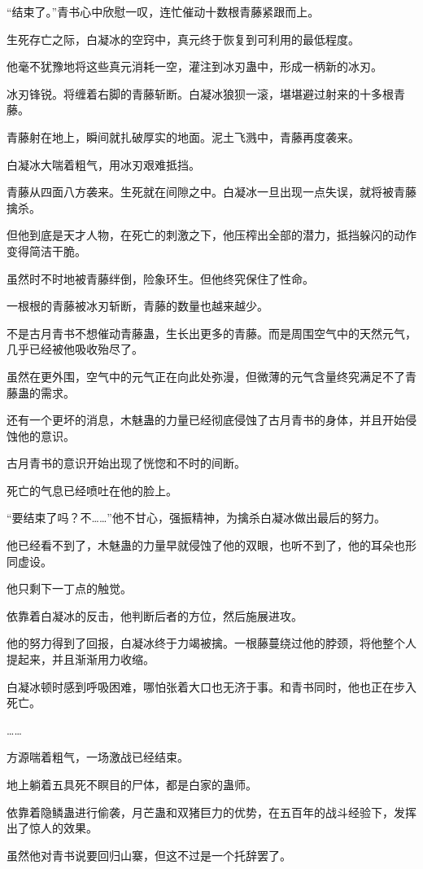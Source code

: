 \begin{this_body}
“结束了。”青书心中欣慰一叹，连忙催动十数根青藤紧跟而上。

生死存亡之际，白凝冰的空窍中，真元终于恢复到可利用的最低程度。

他毫不犹豫地将这些真元消耗一空，灌注到冰刃蛊中，形成一柄新的冰刃。

冰刃锋锐。将缠着右脚的青藤斩断。白凝冰狼狈一滚，堪堪避过射来的十多根青藤。

青藤射在地上，瞬间就扎破厚实的地面。泥土飞溅中，青藤再度袭来。

白凝冰大喘着粗气，用冰刃艰难抵挡。

青藤从四面八方袭来。生死就在间隙之中。白凝冰一旦出现一点失误，就将被青藤擒杀。

但他到底是天才人物，在死亡的刺激之下，他压榨出全部的潜力，抵挡躲闪的动作变得简洁干脆。

虽然时不时地被青藤绊倒，险象环生。但他终究保住了性命。

一根根的青藤被冰刃斩断，青藤的数量也越来越少。

不是古月青书不想催动青藤蛊，生长出更多的青藤。而是周围空气中的天然元气，几乎已经被他吸收殆尽了。

虽然在更外围，空气中的元气正在向此处弥漫，但微薄的元气含量终究满足不了青藤蛊的需求。

还有一个更坏的消息，木魅蛊的力量已经彻底侵蚀了古月青书的身体，并且开始侵蚀他的意识。

古月青书的意识开始出现了恍惚和不时的间断。

死亡的气息已经喷吐在他的脸上。

“要结束了吗？不……”他不甘心，强振精神，为擒杀白凝冰做出最后的努力。

他已经看不到了，木魅蛊的力量早就侵蚀了他的双眼，也听不到了，他的耳朵也形同虚设。

他只剩下一丁点的触觉。

依靠着白凝冰的反击，他判断后者的方位，然后施展进攻。

他的努力得到了回报，白凝冰终于力竭被擒。一根藤蔓绕过他的脖颈，将他整个人提起来，并且渐渐用力收缩。

白凝冰顿时感到呼吸困难，哪怕张着大口也无济于事。和青书同时，他也正在步入死亡。

……

方源喘着粗气，一场激战已经结束。

地上躺着五具死不瞑目的尸体，都是白家的蛊师。

依靠着隐鳞蛊进行偷袭，月芒蛊和双猪巨力的优势，在五百年的战斗经验下，发挥出了惊人的效果。

虽然他对青书说要回归山寨，但这不过是一个托辞罢了。


\end{this_body}
